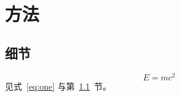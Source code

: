 \documentclass{article}
\begin{document}
\section{方法}\label{sec:method}
\subsection{细节}\label{sec:detail}
\begin{equation}\label{eq:one}
  E = mc^2
\end{equation}
见式~\eqref{eq:one} 与第~\ref{sec:detail}~节。
\end{document}

